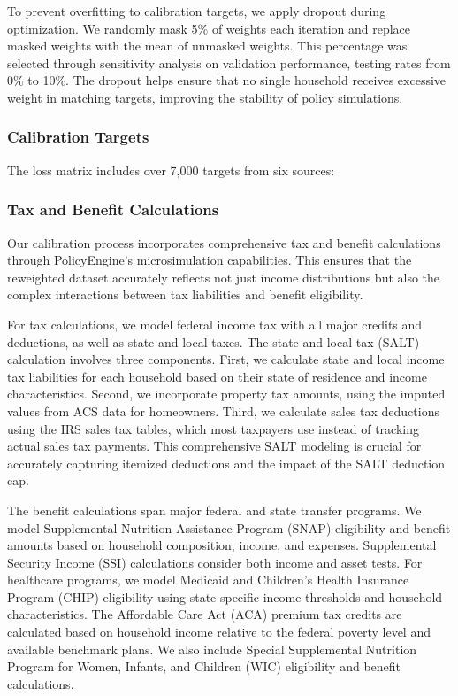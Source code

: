To prevent overfitting to calibration targets, we apply dropout during optimization. We randomly mask 5\% of weights each iteration and replace masked weights with the mean of unmasked weights. This percentage was selected through sensitivity analysis on validation performance, testing rates from 0\% to 10\%. The dropout helps ensure that no single household receives excessive weight in matching targets, improving the stability of policy simulations.

\subsubsection{Calibration Targets}

The loss matrix includes over 7,000 targets from six sources:



\subsubsection{Tax and Benefit Calculations}

Our calibration process incorporates comprehensive tax and benefit calculations through PolicyEngine's microsimulation capabilities. This ensures that the reweighted dataset accurately reflects not just income distributions but also the complex interactions between tax liabilities and benefit eligibility.

For tax calculations, we model federal income tax with all major credits and deductions, as well as state and local taxes. The state and local tax (SALT) calculation involves three components. First, we calculate state and local income tax liabilities for each household based on their state of residence and income characteristics. Second, we incorporate property tax amounts, using the imputed values from ACS data for homeowners. Third, we calculate sales tax deductions using the IRS sales tax tables, which most taxpayers use instead of tracking actual sales tax payments. This comprehensive SALT modeling is crucial for accurately capturing itemized deductions and the impact of the SALT deduction cap.

The benefit calculations span major federal and state transfer programs. We model Supplemental Nutrition Assistance Program (SNAP) eligibility and benefit amounts based on household composition, income, and expenses. Supplemental Security Income (SSI) calculations consider both income and asset tests. For healthcare programs, we model Medicaid and Children's Health Insurance Program (CHIP) eligibility using state-specific income thresholds and household characteristics. The Affordable Care Act (ACA) premium tax credits are calculated based on household income relative to the federal poverty level and available benchmark plans. We also include Special Supplemental Nutrition Program for Women, Infants, and Children (WIC) eligibility and benefit calculations.

